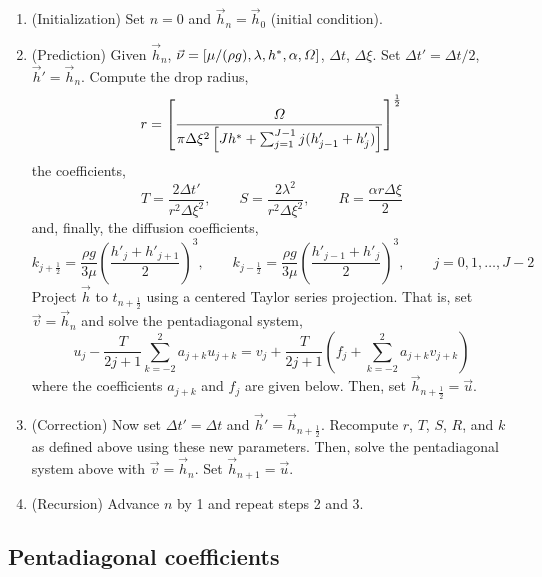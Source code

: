 \documentclass[12pt]{article}
\numberwithin{equation}{section}
\begin{document}
\begin{enumerate}
	\item (Initialization) Set $n = 0$ and $\vec{h}_n = \vec{h}_0$ (initial condition).
	\item (Prediction)
		Given $\vec{h}_n$, $\vec{\nu} = [\mu / (\rho g), \lambda, h^*, \alpha, \mit{\Omega}]$, $\Delta t$, $\Delta \xi$. Set $\Delta t' = \Delta t/2$, $\vec{h}'= \vec{h}_n$. Compute the drop radius,
		\[
			r = 
			\left[
	 	\frac{\mit{\Omega}}{\pi  \Delta \xi^2 \left[ Jh^* +   \sum_{j=1}^{J-1} j (h'_{j-1} + h'_{j}) \right]}
	 \right]^{\frac{1}{2}}
		\]
		the coefficients,
		\[
			T = 
			\frac{2\Delta t'}{r^2\Delta \xi^2},
			\qquad
			S = 
			\frac{2\lambda^2}{r^2\Delta \xi^2},
			\qquad
			R
			=
			\frac{\alpha r \Delta \xi}{2}
		\]
		and, finally, the diffusion coefficients,
		\[
			k_{j+\frac{1}{2}} = \frac{\rho g}{3 \mu} \left( 
				\frac{h'_{j} + h'_{j+1}}{2}
			\right)^3,
			\qquad
			k_{j-\frac{1}{2}} = \frac{\rho g}{3 \mu} \left( 
				\frac{h'_{j-1} + h'_{j}}{2}
			\right)^3,
			\qquad
			j = 0, 1, \dots, J-2
		\]
		Project $\vec{h}$ to $t_{n+\frac{1}{2}}$ using a centered Taylor series projection. That is, set $\vec{v} = \vec{h}_n$ and solve the pentadiagonal system,
		\[
			u_j
			-
			\frac{T}{2 j + 1}
			\sum_{k=-2}^2 a_{j+k} u_{j+k}
			=
			v_{j} 
			+
			\frac{T}{2 j + 1}
			\left(
			f_j
			+
			\sum_{k=-2}^2 a_{j+k} v_{j+k}
			\right)
		\]
		 where the coefficients $a_{j+k}$ and $f_j$ are given below. Then, set $\vec{h}_{n+\frac{1}{2}} = \vec{u}$.
	\item (Correction) Now set $\Delta t' = \Delta t$ and $\vec{h}'= \vec{h}_{n+\frac{1}{2}}$. Recompute $r$, $T$, $S$, $R$, and $k$ as defined above using these new parameters. Then, solve the pentadiagonal system above with $\vec{v} = \vec{h}_n$. Set $\vec{h}_{n+1} = \vec{u}$. 
	\item (Recursion) Advance $n$ by 1 and repeat steps 2 and 3.
\end{enumerate}

\subsection{Pentadiagonal coefficients}
\end{document}
